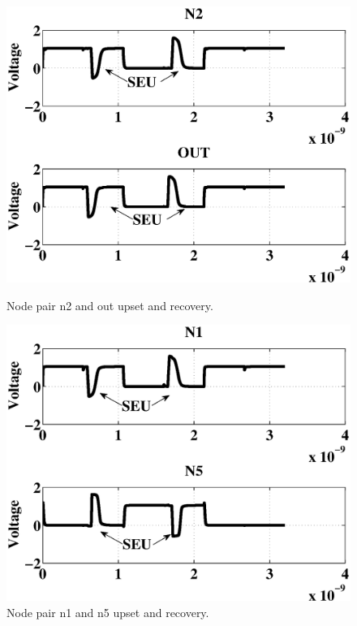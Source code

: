 \begin{figure}[!htbp]
	\centering
	\parbox{4cm}{
		\includegraphics[width=\linewidth]{Figures/WavePlots/n2out.eps}
		\caption{Node pair n2 and out upset and recovery.}
		\label{fig:n2out}}
	\qquad
	\begin{minipage}{4cm}
		\includegraphics[width=\linewidth]{Figures/WavePlots/n1n5.eps}
		\caption{Node pair n1 and n5 upset and recovery.}
		\label{fig:n1n5}
	\end{minipage}
\end{figure}

